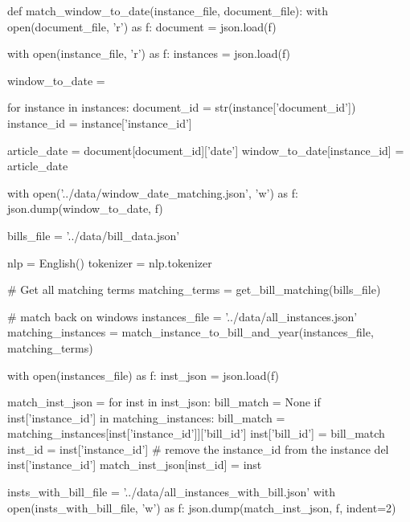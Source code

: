 \begin{pyin}
def match_window_to_date(instance_file, document_file):
    with open(document_file, 'r') as f:
        document = json.load(f)

    with open(instance_file, 'r') as f:
        instances = json.load(f)

    window_to_date = {}

    for instance in instances:
        document_id = str(instance['document_id'])
        instance_id = instance['instance_id']

        article_date = document[document_id]['date']
        window_to_date[instance_id] = article_date

    with open('../data/window_date_matching.json', 'w') as f:
        json.dump(window_to_date, f)
\end{pyin}

\begin{pyin}
bills_file = '../data/bill_data.json'


nlp = English()
tokenizer = nlp.tokenizer

# Get all matching terms
matching_terms = get_bill_matching(bills_file)

# match back on windows
instances_file = '../data/all_instances.json'
matching_instances = match_instance_to_bill_and_year(instances_file, matching_terms)

with open(instances_file) as f:
    inst_json = json.load(f)

match_inst_json = {}
for inst in inst_json:
    bill_match = None
    if inst['instance_id'] in matching_instances:
        bill_match = matching_instances[inst['instance_id']]['bill_id']
    inst['bill_id'] = bill_match
    inst_id = inst['instance_id']
    # remove the instance_id from the instance
    del inst['instance_id']
    match_inst_json[inst_id] = inst
\end{pyin}

\begin{pyin}
insts_with_bill_file = '../data/all_instances_with_bill.json'
with open(insts_with_bill_file, 'w') as f:
    json.dump(match_inst_json, f, indent=2)
\end{pyin}

